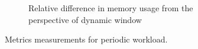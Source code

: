 \begin{figure}
\begin{subfigure}[b]{\textwidth}
        \caption{Relative difference in memory usage from the perspective of dynamic window}
        \label{fig:periodic_mem_diff}
    \end{subfigure}

    \caption{Metrics measurements for periodic workload.}%
    \label{fig:periodic_measurement}
\end{figure}
